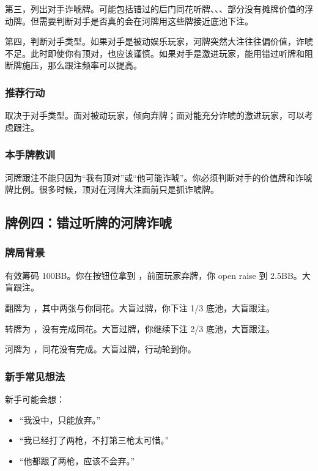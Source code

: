 第三，列出对手诈唬牌。可能包括错过的后门同花听牌、、、部分没有摊牌价值的浮动牌。但需要判断对手是否真的会在河牌用这些牌接近底池下注。

第四，判断对手类型。如果对手是被动娱乐玩家，河牌突然大注往往偏价值，诈唬不足。此时即使你有顶对，也应该谨慎。如果对手是激进玩家，能用错过听牌和阻断牌施压，那么跟注频率可以提高。

\subsubsection*{推荐行动}

取决于对手类型。面对被动玩家，倾向弃牌；面对能充分诈唬的激进玩家，可以考虑跟注。

\subsubsection*{本手牌教训}

河牌跟注不能只因为“我有顶对”或“他可能诈唬”。你必须判断对手的价值牌和诈唬牌比例。很多时候，顶对在河牌大注面前只是抓诈唬牌。

\subsection{牌例四：错过听牌的河牌诈唬}

\subsubsection*{牌局背景}

有效筹码 100BB。你在按钮位拿到 ，前面玩家弃牌，你 open raise 到 2.5BB。大盲跟注。

翻牌为 ，其中两张与你同花。大盲过牌，你下注 1/3 底池，大盲跟注。

转牌为 ，没有完成同花。大盲过牌，你继续下注 2/3 底池，大盲跟注。

河牌为 ，同花没有完成。大盲过牌，行动轮到你。

\subsubsection*{新手常见想法}

新手可能会想：

\begin{itemize}
\item “我没中，只能放弃。”
\item “我已经打了两枪，不打第三枪太可惜。”
\item “他都跟了两枪，应该不会弃。”
\end{itemize}

